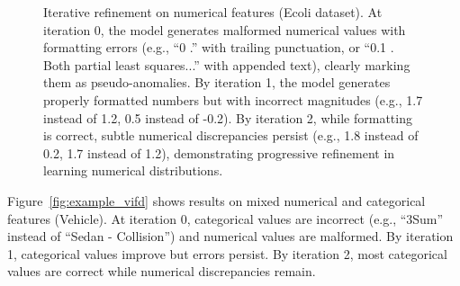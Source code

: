 \begin{figure}[t]
\caption{Iterative refinement on numerical features (Ecoli dataset). At iteration 0, the model generates malformed numerical values with formatting errors (e.g., ``0 .'' with trailing punctuation, or ``0.1 . Both partial least squares...'' with appended text), clearly marking them as pseudo-anomalies. By iteration 1, the model generates properly formatted numbers but with incorrect magnitudes (e.g., 1.7 instead of 1.2, 0.5 instead of -0.2). By iteration 2, while formatting is correct, subtle numerical discrepancies persist (e.g., 1.8 instead of 0.2, 1.7 instead of 1.2), demonstrating progressive refinement in learning numerical distributions.}
\label{fig:example_ecoli}
\end{figure}

Figure~\ref{fig:example_vifd} shows results on mixed numerical and categorical features (Vehicle). At iteration 0, categorical values are incorrect (e.g., ``3Sum'' instead of ``Sedan - Collision'') and numerical values are malformed. By iteration 1, categorical values improve but errors persist. By iteration 2, most categorical values are correct while numerical discrepancies remain.

